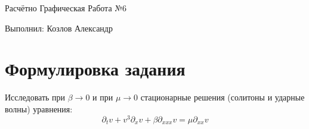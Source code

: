 \documentclass[titlepage]{article}
\begin{document}
\begin{flushright}
    Расчётно Графическая Работа №6
    
    Выполнил: Козлов Александр
\end{flushright}

\section{Формулировка задания}

Исследовать при $\beta \longrightarrow 0$ и при $\mu \longrightarrow 0$ стационарные решения (солитоны и ударные волны) уравнения:
\begin{equation}
    \partial_t v + v^3 \partial_x v + \beta \partial_{xxx} v = \mu \partial_{xx} v
\end{equation}
\end{document}
